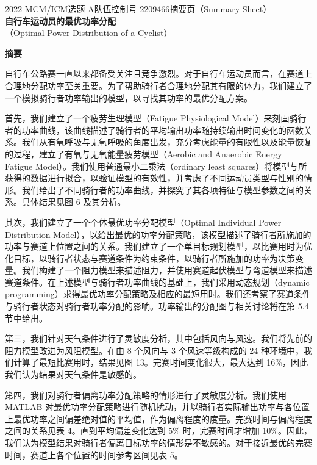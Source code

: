 \documentclass[11pt,a4paper]{ctexart}
\begin{document}
\thispagestyle{empty}
\begin{center}
{\small 2022 MCM/ICM\quad 选题 A\quad 队伍控制号 2209466\quad 摘要页（Summary Sheet）}\\[18pt]
{\LARGE\bfseries 自行车运动员的最优功率分配}\\[8pt]
{\large （Optimal Power Distribution of a Cyclist）}\\[10pt]
\end{center}

\begin{center}
{\large\bfseries 摘\quad 要}
\end{center}

\vspace{6pt}
自行车公路赛一直以来都备受关注且竞争激烈。对于自行车运动员而言，在赛道上合理地分配功率至关重要。为了帮助骑行者合理地分配其有限的体力，我们建立了一个模拟骑行者功率输出的模型，以寻找其功率的最优分配方案。

首先，我们建立了一个疲劳生理模型（Fatigue Physiological Model）来刻画骑行者的功率曲线，该曲线描述了骑行者的平均输出功率随持续输出时间变化的函数关系。我们从有氧呼吸与无氧呼吸的角度出发，充分考虑能量的有限性以及能量恢复的过程，建立了有氧与无氧能量疲劳模型（Aerobic and Anaerobic Energy Fatigue Model）。我们使用普通最小二乘法（ordinary least squares）将模型与所获得的数据进行拟合，以验证模型的有效性，并考虑了不同运动员类型与性别的情形。我们给出了不同骑行者的功率曲线，并探究了其各项特征与模型参数之间的关系。具体结果见图 6 及其分析。

其次，我们建立了一个个体最优功率分配模型（Optimal Individual Power Distribution Model），以给出最优的功率分配策略，该模型描述了骑行者所施加的功率与赛道上位置之间的关系。我们建立了一个单目标规划模型，以比赛用时为优化目标，以骑行者状态与赛道条件为约束条件，以骑行者所施加的功率为决策变量。我们构建了一个阻力模型来描述阻力，并使用赛道起伏模型与弯道模型来描述赛道条件。在上述模型与骑行者功率曲线的基础上，我们采用动态规划（dynamic programming）求得最优功率分配策略及相应的最短用时。我们还考察了赛道条件与骑行者状态对骑行者功率分配的影响。功率输出的分配图与相关讨论将在第 5.4 节中给出。

第三，我们针对天气条件进行了灵敏度分析，其中包括风向与风速。我们将先前的阻力模型改进为风阻模型。在由 8 个风向与 3 个风速等级构成的 24 种环境中，我们计算了最短比赛用时，结果见图 13。完赛时间变化很大，最大达到 16\%，因此我们认为结果对天气条件是敏感的。

第四，我们对骑行者偏离功率分配策略的情形进行了灵敏度分析。我们使用 MATLAB 对最优功率分配策略进行随机扰动，并以骑行者实际输出功率与各位置上最优功率之间偏差绝对值的平均值，作为偏离程度的度量。完赛时间与偏离程度之间的关系见表 4。直到平均偏差变化达到 5\% 时，完赛时间才增加 10\%。因此，我们认为模型结果对骑行者偏离目标功率的情形是不敏感的。对于接近最优的完赛时间，赛道上各个位置的时间参考区间见表 5。
\end{document}
